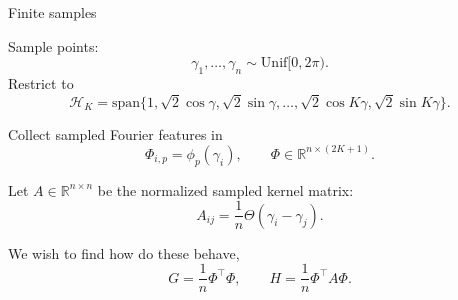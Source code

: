 \documentclass[10pt,aspectratio=169]{beamer}
\begin{document}
\begin{frame}{Finite samples}

	Sample points:
	\[
		\gamma_1,\ldots,\gamma_n \sim \mathrm{Unif}[0,2\pi).
	\]
	Restrict to
	\[
		\mathcal H_K=\mathrm{span}\{1,\sqrt{2}\cos\gamma,\sqrt{2}\sin\gamma,\ldots,
		\sqrt{2}\cos K\gamma,\sqrt{2}\sin K\gamma\}.
	\]

	\pause
	Collect sampled Fourier features in
	\[
		\Phi_{i,p}=\phi_p(\gamma_i),
		\qquad
		\Phi\in\mathbb R^{n\times (2K+1)}.
	\]

	Let \(A\in\mathbb R^{n\times n}\) be the normalized sampled kernel matrix:
	\[
		A_{ij}
		=
		\frac1n\Theta(\gamma_i-\gamma_j).
	\]

	\pause
	We wish to find how do these behave,
	\[
		G=\frac1n\Phi^\top\Phi,
		\qquad
		H=\frac1n\Phi^\top A\Phi .
	\]


\end{frame}
\end{document}

